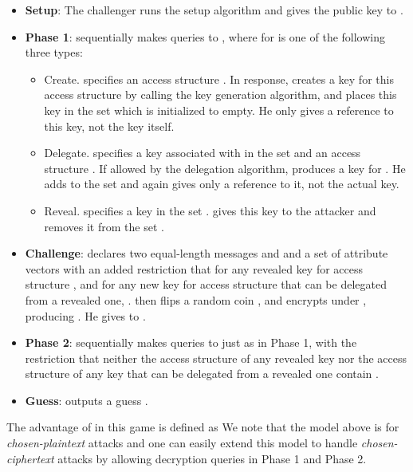 \documentclass[twocolumn]{svjour3}          \smartqed  \usepackage{graphicx}
\begin{document}
\begin{itemize}
   \item \textbf{Setup}: The challenger  runs the setup algorithm and gives the public key  to .

   \medskip
   \item \textbf{Phase 1}:  sequentially makes queries  to , where  for 
       is one of the following three types:
   \begin{itemize}
     \item {\sf Create}.  specifies an access structure . In response,  creates a
         key for this access structure by calling the key generation algorithm, and places this key in the set  which is initialized to empty. He only gives  a reference to this key, not the key itself.
     \item {\sf Delegate}.  specifies a key  associated with  in the set  and an access structure  . If allowed by the delegation algorithm,  produces a key  for
         . He adds  to the set  and again gives  only a reference to it, not the actual key.
     \item {\sf Reveal}.  specifies a key in the set .  gives this key to the
         attacker and removes it from the set .
   \end{itemize}

\medskip
   \item \textbf{Challenge}:  declares two equal-length messages  and  and a set  of attribute vectors
       with an added restriction that for any revealed key  for access structure ,  and for any new key  for access structure
        that can be delegated from a revealed one, .  then flips a random coin , and
       encrypts  under , producing . He gives  to .

       \medskip
   \item \textbf{Phase 2}:   sequentially makes queries  to  just as in Phase 1, with the
       restriction that neither the access structure of any revealed key nor the access structure of any key that can be delegated from a revealed one
contain .

       \medskip
   \item \textbf{Guess}:  outputs a guess .
\end{itemize}

The advantage of  in this game is defined as  We note that the model above
is for {\em chosen-plaintext } attacks and one can easily extend this model to handle {\em chosen-ciphertext} attacks by allowing decryption queries in
Phase 1 and  Phase 2.
\end{document}
